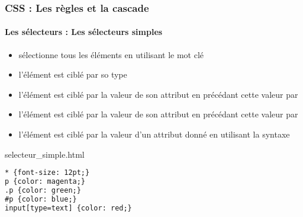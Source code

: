 \documentclass[xcolor=table]{beamer}
\begin{document}
\begin{frame}[fragile]
\frametitle{CSS : Les règles et la cascade}
\framesubtitle{Les sélecteurs : Les sélecteurs simples}

\begin{minipage}{0.60\textwidth} 
	\begin{itemize}
		\item {} sélectionne tous les éléments en utilisant le mot clé \keyword{*}
		\item {} l'élément est ciblé par so type
		\item {} l'élément est ciblé par la valeur de son attribut  en précédant cette valeur par 
		\item {} l'élément est ciblé par la valeur de son attribut  en précédant cette valeur par \keyword{\#}
		\item {} l'élément est ciblé par la valeur d'un attribut donné en utilisant la syntaxe 
	\end{itemize}
\end{minipage}
%
\begin{minipage}{0.38\textwidth}
\begin{block}{selecteur\_simple.html}
\scriptsize\bfseries
\begin{lstlisting}[language={html}]
* {font-size: 12pt;}
p {color: magenta;}
.p {color: green;}
#p {color: blue;}
input[type=text] {color: red;}
\end{lstlisting}
\end{block}
\end{minipage}
\end{frame}
\end{document}

